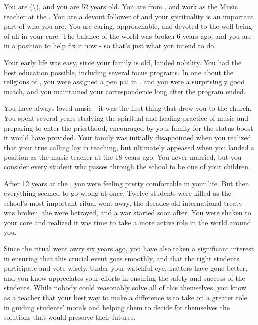 \documentclass[char]{GL2020}
\begin{document}
\name{\cMusic{}}


You are \cMusic{} (\cMusic{\they}\textbackslash\cMusic{\them}), and you are 52 years old. You are from \pFarm{}, and work as the Music teacher at the \pSchool{}. You are a devout follower of \cFarmGod{} and your spirituality is an important part of who you are. You are caring, approachable, and devoted to the well being of all in your care. The balance of the world was broken 6 years ago, and you are in a position to help fix it now - so that's just what you intend to do.

Your early life was easy, since your family is old, landed nobility. You had the best education possible, including several focus programs. In one about the religions of \pEarth{}, you were assigned a pen pal in \pTech{}. \cBeetle{} and you were a surprisingly good match, and you maintained your correspondence long after the program ended. 

You have always loved music - it was the first thing that drew you to the church. You spent several years studying the spiritual and healing practice of music and preparing to enter the priesthood, encouraged by your family for the status boost it would have provided. Your family was initially disappointed when you realized that your true calling lay in teaching, but ultimately appeased when you landed a position as the music teacher at the \pSchool{} 18 years ago. You never married, but you consider every student who passes through the school to be one of your children.

After 12 years at the \pSchool{}, you were feeling pretty comfortable in your life. But then everything seemed to go wrong at once. Twelve students were killed as the school’s most important ritual went awry, the decades old international treaty was broken, the \pShip{} were betrayed, and a war started soon after. You were shaken to your core and realized it was time to take a more active role in the world around you.

Since the ritual went awry six years ago, you have also taken a significant interest in ensuring that this crucial event goes smoothly, and that the right students participate and vote wisely.  Under your watchful eye, matters have gone better, and you know \cPrincipal{} appreciates your efforts in ensuring the safety and success of the students. While nobody could reasonably solve all of this themselves, you know as a teacher that your best way to make a difference is to take on a greater role in guiding students' morals and helping them to decide for themselves the solutions that would preserve their futures.
\end{document}
